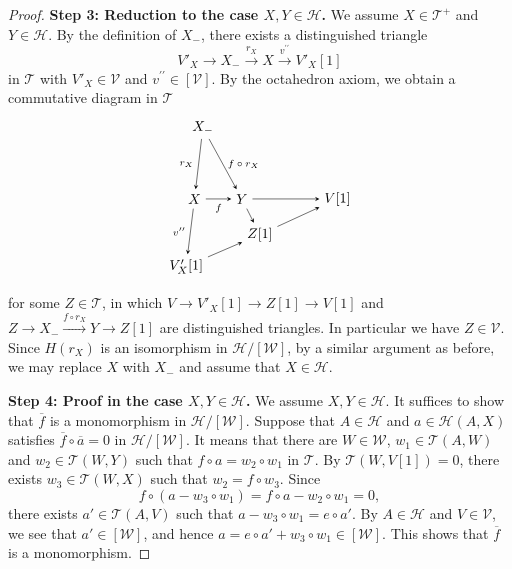 \documentclass[a4paper,reqno,10pt]{amsart}
\DeclareRobustCommand{\darkblueedit}[1]{#1}
\theoremstyle{definition}
\theoremstyle{definition}
\theoremstyle{definition}
\theoremstyle{definition}
\theoremstyle{plain}
\newcommand{\CH}{\mathcal{H}}
\newcommand{\CT}{\mathcal{T}}
\newcommand{\CV}{\mathcal{V}}
\newcommand{\CW}{\mathcal{W}}
\begin{document}
\begin{proof}
\textbf{Step 3: Reduction to the case $X,Y\in\CH$.}
We assume $X\in\CT^+$ and $Y\in\CH$. By the definition of $X_-$, there exists a distinguished triangle
\[
V'_X\to X_-\xrightarrow{r_X}X\xrightarrow{v^{\prime\prime}}V'_X[1]
\]
in $\CT$ with $V'_X\in\CV$ and $v^{\prime\prime}\in[\CV]$. By the octahedron axiom, we obtain a commutative diagram in $\CT$
\[
\begin{tikzpicture}[>=stealth]
\node (1) at (-0.98,1.8) {$X_-$};
\node (2) at (-1.19,0) {$X$};
\node (3) at (-1.4,-1.7) {$V'_X[1]$};
\node (4) at (0,0) {$Y$};
\node (5) at (0.45,-0.9) {$Z[1]$};
\node (6) at (2.4,0) {$V[1]$};
\draw[->] (1) -- node[left,font=\scriptsize] {$r_X$} (2);
\draw[->] (1) -- node[right,font=\scriptsize] {$f\circ r_X$} (4);
\draw[->] (2) -- node[left,font=\scriptsize] {$v^{\prime\prime}$} (3);
\draw[->] (2) -- node[below,font=\scriptsize] {$f$} (4);
\draw[->] (3) -- (5);
\draw[->] (4) -- node[left,font=\scriptsize] {} (5);
\draw[->] (4) -- node[above,font=\scriptsize] {} (6);
\draw[->] (5) -- node[below,font=\scriptsize] {} (6);
\end{tikzpicture}
\]
for some $Z\in\CT$, in which 
$V\to V'_X[1]\to Z[1]\to V[1]$
and $Z\to X_-\xrightarrow{f\circ r_X} Y\to Z[1]$
are distinguished triangles. In particular we have $Z\in\CV$. Since $H(r_X)$ is an isomorphism in $\CH/[\CW]$, by a similar argument as before, \darkblueedit{we may replace} $X$ with $X_-$ and assume that $X\in\CH$.

\textbf{Step 4: Proof in the case $X,Y\in\CH$.}
We assume $X,Y\in\CH$. It suffices to show that $\overline{f}$ is a monomorphism in $\CH/[\CW]$.
Suppose that $A\in\CH$ and $a\in\CH(A,X)$ satisfies $\overline{f}\circ\overline{a}=0$ in $\CH/[\CW]$. It means that there are $W\in\CW$, $w_1\in\CT(A,W)$ and $w_2\in\CT(W,Y)$ such that $f\circ a=w_2\circ w_1$ in $\CT$. By $\CT(W,V[1])=0$, there exists $w_3\in\CT(W,X)$ such that $w_2=f\circ w_3$. Since 
\[
f\circ(a-w_3\circ w_1)=f\circ a-w_2\circ w_1=0,
\]
there exists $a'\in\CT(A,V)$ such that $a-w_3\circ w_1=e\circ a'$. By $A\in\CH$ and $V\in\CV$, we see that $a'\in[\CW]$, and hence $a=e\circ a'+w_3\circ w_1\in[\CW]$. This shows that $\overline{f}$ is a monomorphism.
\end{proof}
\end{document}
